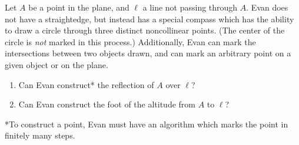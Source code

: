 Let $A$ be a point in the plane, and $\ell$ a line not passing through $A$. Evan does not have a straightedge, but instead has a special compass which has the ability to draw a circle through three distinct noncollinear points. (The center of the circle is \emph{not} marked in this process.) Additionally, Evan can mark the intersections between two objects drawn, and can mark an arbitrary point on a given object or on the plane.
\begin{enumerate}[label=(\roman*)]
	\item Can Evan construct* the reflection of $A$ over $\ell$?
	\item Can Evan construct the foot of the altitude from $A$ to $\ell$?
\end{enumerate}
*To construct a point, Evan must have an algorithm which marks the point in finitely many steps.
